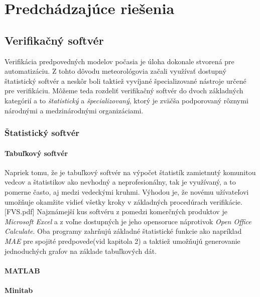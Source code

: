\chapter{Predchádzajúce riešenia}

\section{Verifikačný softvér}

Verifikácia predpovedných modelov počasia je úloha dokonale stvorená pre automatizáciu. 
Z tohto dôvodu meteorológovia začali využívať dostupný štatistický softvér 
a neskôr boli taktiež vyvíjané špecializované nástroje určené pre verifikáciu.
Môžeme teda rozdeliť verifikačný softvér do dvoch základných kategórií a to \textit{štatistický} a \textit{špecializovaný}, ktorý je zväčša podporovaný rôznymi národnými a medzinárodnými organizáciami.

\subsection{Štatistický softvér}

\subsubsection{Tabuľkový softvér}
Napriek tomu, že je tabuľkový softvér na výpočet štatistík zamietnutý komunitou vedcov a štatistikov ako nevhodný a neprofesionálny, tak je využívaný, a to pomerne často, aj medzi vedeckými kruhmi. 
Výhodou je, že novému užívateľovi umožňuje okamžite vidieť všetky kroky v základných procedúrach verifikácie. [FVS.pdf] %
Najznámejší kus softvéru z pomedzi komerčných produktov je \textit{Microsoft Excel} a z voľne dostupných je jeho opensoruce náprotivok \textit{Open Office Calculate}. Oba programy zahrňujú základné štatistické funkcie ako napríklad \textit{MAE} pre spojité predpovede(vid kapitola 2) a taktiež umožňujú generovanie jednoduchých grafov na základe tabuľkových dát.



\subsubsection{MATLAB}

\subsubsection{Minitab}

